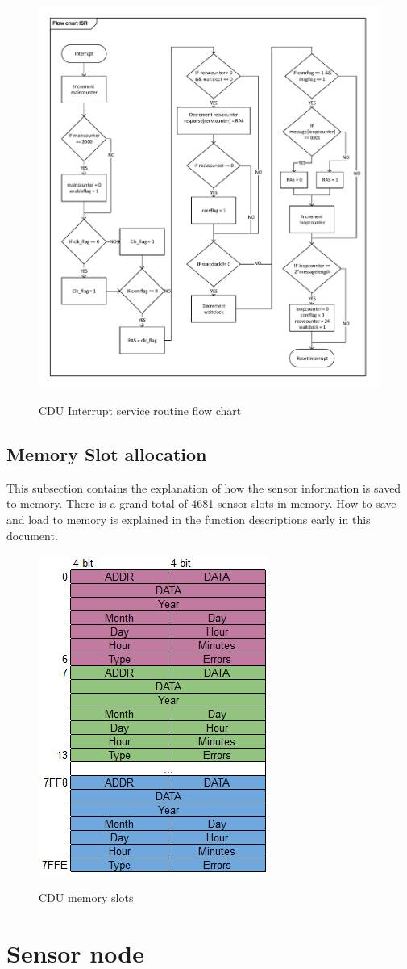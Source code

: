 \begin{figure}[H]
\centering
\includegraphics[width=1\textwidth]{billeder/isrflowchart}
\label{fig:isrflowchart}
\caption{CDU Interrupt service routine flow chart}
\end{figure}

\subsection{Memory Slot allocation}
This subsection contains the explanation of how the sensor information is saved to memory. There is a grand total of 4681 sensor slots in memory. How to save and load to memory is explained in the function descriptions early in this document.
\begin{figure}[H]
\centering
\includegraphics[scale=1]{billeder/memoryslots}
\label{fig:memoryslots}
\caption{CDU memory slots}
\end{figure}

\section{Sensor node}